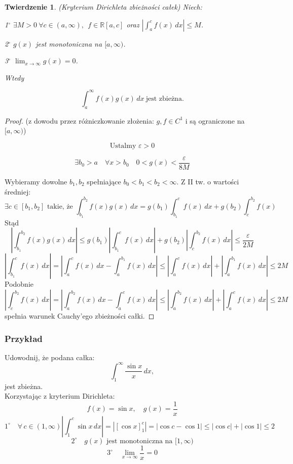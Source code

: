 \documentclass{article}
\newtheorem{theorem}{Twierdzenie}
\theoremstyle{definition}
\begin{document}
	\begin{theorem}{(Kryterium Dirichleta zbieżności całek)}
		Niech:
		
		1$^{\circ}$ $\exists M > 0 \ \forall c \in (a,\infty), \ \ f \in \mathbb{R}[a,c]$ oraz $\left|\int_{a}^{c} f(x) \, dx\right| \leq M$.
		
		2$^{\circ}$ $g(x)$ jest monotoniczna na $[a,\infty)$.
		
		3$^{\circ}$ $\lim_{x \to \infty} g(x) = 0$.
		
		Wtedy
		
		\[
		\int_{a}^{\infty} f(x) g(x) \, dx \ \text{jest zbieżna}.
		\]
	\end{theorem}
	\begin{proof}
		(z dowodu przez różniczkowanie złożenia: $g, f \in C^1$ i są ograniczone na $[a, \infty)$)
		
		\[
		\text{Ustalmy } \varepsilon > 0
		\]
		
		\[
		\exists b_0 > a \quad \forall x > b_0 \quad 0 < g(x) < \frac{\varepsilon}{8M}
		\]
		
		Wybieramy dowolne $b_1, b_2$ spełniające $b_0 < b_1 < b_2 < \infty$.
		Z II tw. o wartości średniej:
		\[
		\exists c \in [b_1,b_2] \text{ takie, że } \int_{b_1}^{b_2} f(x)g(x) \, dx = g(b_1)\int_{b_1}^{c}f(x) \, dx + g(b_2)\int_{c}^{b_2}f(x)
		\]
		Stąd
		\[
		\left|\int_{b_1}^{b_2} f(x) g(x) \, dx\right| \leq g(b_1) \left| \int_{b_1}^{c} f(x) \, dx \right| + g(b_2) \left|\int_{c}^{b_2} f(x) \, dx \right| \leq \frac{\varepsilon}{2M}
		\]
		\[
		\left|\int_{b_1}^{c} f(x) \, dx\right| = \left|\int_{a}^{c} f(x) \, dx - \int_{a}^{b_1} f(x) \, dx \right| \leq \left|\int_{a}^{c} f(x) \, dx \right| + \left| \int_{a}^{b_1} f(x) \, dx \right| \leq 2M
		\]
		Podobnie
		\[
		\left|\int_{c}^{b_2} f(x) \, dx \right|= \left| \int_{a}^{b_2} f(x) \, dx - \int_{a}^{c} f(x) \, dx \right| \leq \left| \int_{a}^{b_2} f(x) \, dx \right| +  \left| \int_{a}^{c} f(x) \, dx \right| \leq 2M
		\]
		spełnia warunek Cauchy'ego zbieżności całki.
	\end{proof}
		
	\subsubsection*{Przykład}
	Udowodnij, że podana całka:
	\[
	\int_{1}^{\infty} \frac{\sin x}{x} \, dx,
	\] jest zbieżna.\\ Korzystając z kryterium Dirichleta:
	\[
	f(x) = \sin x, \quad g(x) = \frac{1}{x}
	\]
	\[
	1^\circ \quad \forall \, c \in (1, \infty) \left|\int_{1}^{c} \sin x \, dx\right| = \left|\left[\cos x\right]_{1}^{c}\right| = \left|\cos c - \cos 1\right| \leq \left|\cos c\right| + \left|\cos 1\right| \leq 2
	\]
	\[
	2^\circ \quad g(x) \text{ jest monotoniczna na } [1, \infty)
	\]
	\[
	3^\circ \quad \lim_{x \to \infty} \frac{1}{x} = 0
	\]
	
\end{document}
